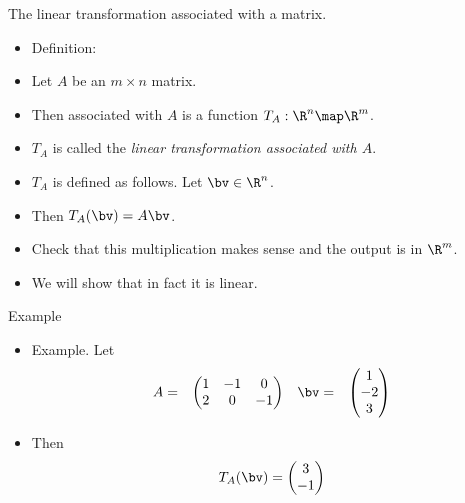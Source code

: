 \documentclass{beamer}
\begin{document}
\begin{frame}{The linear transformation associated with a matrix.}

\begin{itemize}
\item Definition:
\item Let $A$ be an $m\times n$ matrix.
\item Then associated with $A$ is a function $T_A:\R^n\map\R^m$.
\item $T_A$ is called the \emph{linear transformation associated with $A$}.
\item $T_A$ is defined as follows. Let $\bv\in\R^n$.
\item Then $T_A(\bv) = A \bv$.
\item Check that this multiplication makes sense and the output is in $\R^m$.
\item We will show that in fact it is linear.
\end{itemize}
\end{frame}


\begin{frame}{Example}

\begin{itemize}
\item Example. Let
$$
\begin{matrix}
A =
&
\begin{pmatrix}
1 & -1  & 0 \\
2 &  0  & -1
\end{pmatrix}
&
\bv =
&
\begin{pmatrix}
1 \\ -2 \\ 3
\end{pmatrix}
\end{matrix}
$$
\item Then
$$
T_A(\bv) =
\begin{pmatrix}
3 \\-1
\end{pmatrix}
$$
\end{itemize}

\end{frame}
\end{document}
